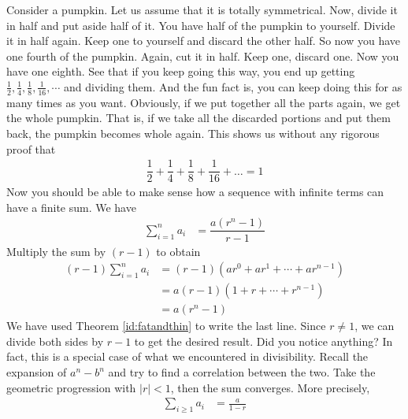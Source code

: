 \documentclass{subfile}
\begin{document}
	Consider a pumpkin. Let us assume that it is totally symmetrical. Now, divide it in half and put aside half of it. You have half of the pumpkin to yourself. Divide it in half again. Keep one to yourself and discard the other half. So now you have one fourth of the pumpkin. Again, cut it in half. Keep one, discard one. Now you have one eighth. See that if you keep going this way, you end up getting $\frac{1}{2},\frac{1}{4},\frac{1}{8},\frac{1}{16},\cdots$ and dividing them. And the fun fact is, you can keep doing this for as many times as you want. Obviously, if we put together all the parts again, we get the whole pumpkin. That is, if we take all the discarded portions and put them back, the pumpkin becomes whole again. This shows us without any rigorous proof that
		\begin{align*}
			\dfrac{1}{2}+\dfrac{1}{4}+\dfrac{1}{8}+\dfrac{1}{16}+\ldots=1
		\end{align*}
	Now you should be able to make sense how a sequence with infinite terms can have a finite sum. We have
		\begin{align*}
			\sum_{i=1}^{n} a_i &= \dfrac{a \left(r^n-1\right)}{r-1}
		\end{align*}
	Multiply the sum by $(r-1)$ to obtain
		\begin{align*}
			(r-1)\sum_{i=1}^{n} a_i &= (r-1)(ar^0 + ar^1 + \cdots + ar^{n-1})\\
									&= a(r-1)(1+r+ \cdots + r^{n-1})\\
									&= a(r^n -1)
		\end{align*}
	We have used Theorem \ref{id:fatandthin} to write the last line. Since $r \neq 1$, we can divide both sides by $r-1$ to get the desired result. Did you notice anything? In fact, this is a special case of what we encountered in divisibility. Recall the expansion of $a^n-b^n$ and try to find a correlation between the two. Take the geometric progression with $|r|<1$, then the sum converges. More precisely,
		\begin{align*}
			\sum_{i\geq1} a_i &= \frac{a}{1-r}
		\end{align*}
\end{document}
